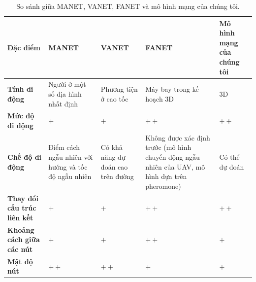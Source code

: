 \documentclass[11pt,openany]{book}
\begin{document}
\begin{table}[H]
    \centering
    \caption{So sánh giữa MANET, VANET, FANET và mô hình mạng của chúng tôi.}
    \label{tab:4.2}
    \begin{tabular}{|p{2.8cm}|p{1.5cm}|p{1.5cm}|p{1.8cm}|p{1.8cm}|}\hline
        \textbf{Đặc điểm}                                                 & \textbf{MANET}                                      & \textbf{VANET}                       & \textbf{FANET}                                                                                 & \textbf{Mô hình mạng của chúng tôi}
        \\\hline
        \textbf{Tính di động}                                             & Người ở một số địa hình nhất định                   & Phương tiện ở cao tốc                & Máy bay trong kế hoạch 3D                                                                      & 3D                                  \\\hline
        \textbf{Mức độ di động}                                           & $+$                                                 & $+$                                  & $++$                                                                                           & $++$                                \\\hline
        \textbf{Chế độ di động}                                           & Điểm cách ngẫu nhiên với hướng và tốc độ ngẫu nhiên & Có khả năng dự đoán cao trên đường   & Không được xác định trước (mô hình chuyển động ngẫu nhiên của UAV, mô hình dựa trên pheromone) & Có thể dự đoán                      \\\hline
        \textbf{Thay đổi cấu trúc liên kết}                               & $+$                                                 & $+$                                  & $++$                                                                                           & $++$                                \\\hline
        \textbf{Khoảng cách giữa các nút}                                 & $+$                                                 & $+$                                  & $++$                                                                                           & $+$                                 \\\hline
        \textbf{Mật độ nút}                                               & $++$                                                & $++$                                 & $+$                                                                                            & $+$                                 \\\hline

\end{tabular}
\end{table}
\end{document}
